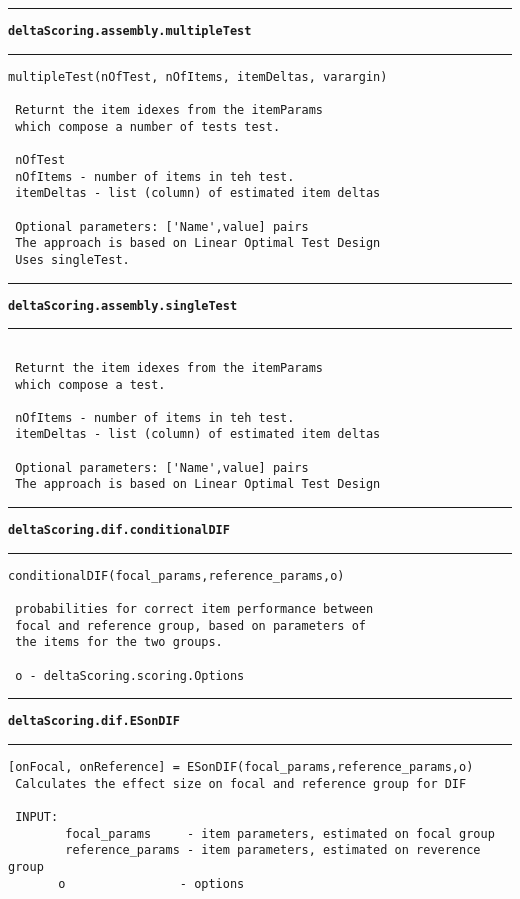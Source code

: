 \par\noindent\rule{\textwidth}{0.4pt}
{\bf\tt deltaScoring.assembly.multipleTest}
\par\noindent\rule{\textwidth}{0.4pt}
\begin{lstlisting}[style=Matlab-bw]
 multipleTest(nOfTest, nOfItems, itemDeltas, varargin)

 Returnt the item idexes from the itemParams
 which compose a number of tests test.

 nOfTest
 nOfItems - number of items in teh test.
 itemDeltas - list (column) of estimated item deltas

 Optional parameters: ['Name',value] pairs
 The approach is based on Linear Optimal Test Design
 Uses singleTest.
\end{lstlisting}
\par\noindent\rule{\textwidth}{0.4pt}
{\bf\tt deltaScoring.assembly.singleTest}
\par\noindent\rule{\textwidth}{0.4pt}
\begin{lstlisting}[style=Matlab-bw]

 Returnt the item idexes from the itemParams
 which compose a test.
 
 nOfItems - number of items in teh test.
 itemDeltas - list (column) of estimated item deltas

 Optional parameters: ['Name',value] pairs
 The approach is based on Linear Optimal Test Design
\end{lstlisting}
\par\noindent\rule{\textwidth}{0.4pt}
{\bf\tt deltaScoring.dif.conditionalDIF}
\par\noindent\rule{\textwidth}{0.4pt}
\begin{lstlisting}[style=Matlab-bw]
 conditionalDIF(focal_params,reference_params,o)

 probabilities for correct item performance between
 focal and reference group, based on parameters of 
 the items for the two groups.
 
 o - deltaScoring.scoring.Options

\end{lstlisting}
\par\noindent\rule{\textwidth}{0.4pt}
{\bf\tt deltaScoring.dif.ESonDIF}
\par\noindent\rule{\textwidth}{0.4pt}
\begin{lstlisting}[style=Matlab-bw]
 [onFocal, onReference] = ESonDIF(focal_params,reference_params,o)
 Calculates the effect size on focal and reference group for DIF
 
 INPUT:
		focal_params 	 - item parameters, estimated on focal group
		reference_params - item parameters, estimated on reverence group
       o                - options
\end{lstlisting}
